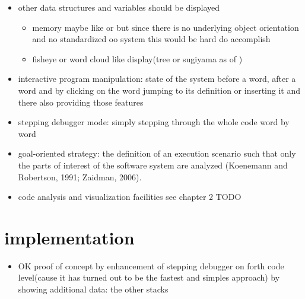 \begin{itemize}

\item other data structures and variables should be displayed
	\begin{itemize}
	\item memory maybe like \cite{ReissProgrammingEnvironments1995} or \cite{Aftandilian:2010:HIH:1879211.1879222} but since there is no underlying object orientation and no standardized oo system this would be hard do accomplish
	\item fisheye or word cloud like display(tree or sugiyama as of \cite{Storey:1997:IVT:857188.857642})
	\end{itemize}
	
\item interactive program manipulation: state of the system before a word, after a word and by clicking on the word jumping to its definition or inserting it and there also providing those features

\item stepping debugger mode: simply stepping through the whole code word by word

\item goal-oriented strategy: the definition of an execution scenario such that only the parts of interest of the software system are analyzed (Koenemann and Robertson, 1991; Zaidman,
2006).

\item code analysis and visualization facilities see chapter 2 TODO

\end{itemize}
	
\section{implementation}
\begin{itemize}
\item OK proof of concept by enhancement of stepping debugger on forth code level(cause it has turned out to be the fastest and simples approach) by showing additional data: the other stacks
\end{itemize}

